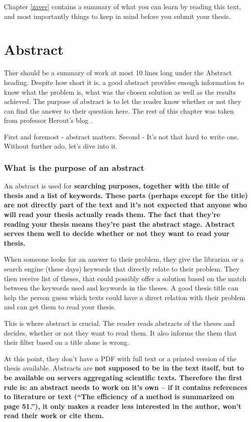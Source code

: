 Chapter \ref{zaver} contains a summary of what you can learn by reading this text, and most importantly things to keep in mind before you submit your thesis.

\chapter{Abstract}
\label{abstrakt}

Ther should be a summary of work at most 10 lines long under the Abstract heading. Despite how short it is, a good abstract provides enough information to know what the problem is, what was the chosen solution as well as the results achieved. The purpose of abstract is to let the reader know whether or not they can find the answer to their question here. The rest of this chapter was taken from professor Herout's blog \cite{Herout}.
\bigskip

\noindent First and foremost - abstract matters. Second - It's not that hard to write one. Without further ado, let's dive into it.

\subsection*{What is the purpose of an abstract}
An abstract is used for \bf searching \rm purposes, together with the title of thesis and a list of keywords. These parts (perhaps except for the title) are not directly part of the text and it's not expected that anyone who will read your thesis actually reads them. The fact that they're reading your thesis means they're past the abstract stage. Abstract serves them well to decide \bf whether or not \rm they want to read your thesis.

When someone looks for an answer to their problem, they give the librarian or a search engine (these days) keywords that directly relate to their problem. They then receive list of theses, that could possibly offer a solution based on the match between the keywords used and keywords in the theses. A good thesis title can help the person guess which texts could have a direct relation with their problem and can get them to read your thesis.

This is where abstract is crucial. The reader reads abstracts of the theses and decides, whether or not they want to read them. It also informs the them that their filter based on a title alone is wrong.

At this point, they don't have a PDF with full text or a printed version of the thesis available. Abstracts are \bf not \rm supposed to be in the text itself, but to be available on servers aggregating scientific texts. Therefore the first rule is: an abstract needs to work on it's own -- if it contains references to literature or text (``The efficiency of a method is summarized on page 51.''), it only makes a reader less interested in the author, won't read their work or cite them.


